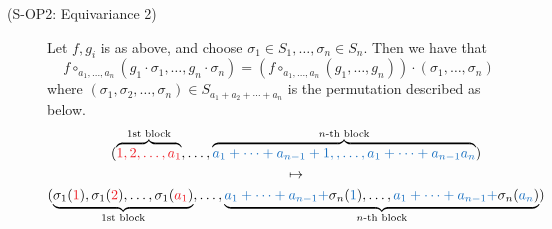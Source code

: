 \begin{definition}
\begin{description}
        \item[(S-OP2: Equivariance 2)]  
        Let $f, g_i$ is as above, and choose $\sigma_1 \in S_1, \dots, \sigma_{n} \in S_n$. 
        Then we have that 
        \[
            f \circ_{a_1, \dots, a_n}(g_1 \cdot \sigma_1, \dots, g_n \cdot \sigma_n)
            =
            (f \circ_{a_1, \dots, a_n}(g_1, \dots, g_n))\cdot (\sigma_1, \dots,\sigma_n)
        \]
        where $(\sigma_1, \sigma_2, \dots, \sigma_n) \in S_{a_1 + a_2 + \cdots + a_n}$ 
        is the permutation described as below. 
        \begin{gather*}
            (\overbrace{\textcolor{Red}{1, 2, \dots, a_1}}^{\text{1st block}}
            ,\dots,
            \overbrace{\textcolor{RoyalBlue}{a_1 + \cdots + a_{n-1}+ 1,, \dots, a_1 + \cdots + a_{n-1}a_n}}^{n\text{-th block}} )
            \\
            \mapsto\\
            (\underbrace{\sigma_1(\textcolor{Red}{1}), \sigma_1(\textcolor{Red}{2}), \dots, \sigma_1(\textcolor{Red}{a_1})}_{\text{1st block}}, 
            \dots, 
            \underbrace{\textcolor{RoyalBlue}{a_1 + \cdots +  a_{n-1}+}
            \sigma_n(\textcolor{RoyalBlue}{1}), 
            \dots, \textcolor{RoyalBlue}{a_1 + \cdots +  a_{n-1}+}\sigma_n(\textcolor{RoyalBlue}{a_n})
            }_{n\text{-th block}}
            )
        \end{gather*}
    \end{description}
\end{definition}

